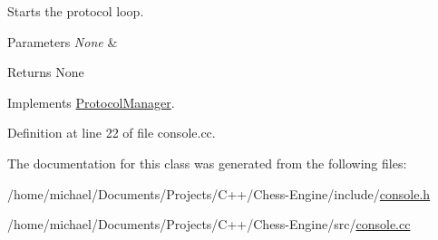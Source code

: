 Starts the protocol loop. 


\begin{DoxyParams}{Parameters}
{\em None} & \\
\hline
\end{DoxyParams}
\begin{DoxyReturn}{Returns}
None 
\end{DoxyReturn}


Implements \mbox{\hyperlink{classProtocolManager_aa3ae25a03e2f070ea486fd9319715a6a}{Protocol\+Manager}}.



Definition at line 22 of file console.\+cc.



The documentation for this class was generated from the following files\+:\begin{DoxyCompactItemize}
\item 
/home/michael/\+Documents/\+Projects/\+C++/\+Chess-\/\+Engine/include/\mbox{\hyperlink{console_8h}{console.\+h}}\item 
/home/michael/\+Documents/\+Projects/\+C++/\+Chess-\/\+Engine/src/\mbox{\hyperlink{console_8cc}{console.\+cc}}\end{DoxyCompactItemize}
